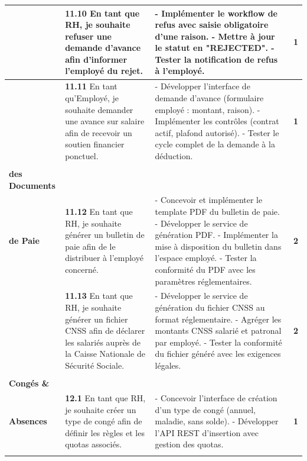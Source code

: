 \begin{small}
\begin{longtable}{|>{\raggedright\arraybackslash}p{2.8cm}|>{\raggedright\arraybackslash}p{6.2cm}|>{\raggedright\arraybackslash}p{6.2cm}|c|}
& \textbf{11.10} En tant que RH, je souhaite refuser une demande d'avance afin d'informer l'employé du rejet.
& - Implémenter le workflow de refus avec saisie obligatoire d'une raison.\newline
- Mettre à jour le statut en "REJECTED".\newline
- Tester la notification de refus à l'employé.
& \textbf{1} \\ \cline{2-4}

& \textbf{11.11} En tant qu'Employé, je souhaite demander une avance sur salaire afin de recevoir un soutien financier ponctuel.
& - Développer l'interface de demande d'avance (formulaire employé : montant, raison).\newline
- Implémenter les contrôles (contrat actif, plafond autorisé).\newline
- Tester le cycle complet de la demande à la déduction.
& \textbf{1} \\ \hline

\multirow{2}{*}{\makecell[c]{\textbf{Génération}\\ \textbf{des Documents}\\ \textbf{de Paie}}}
& \textbf{11.12} En tant que RH, je souhaite générer un bulletin de paie afin de le distribuer à l'employé concerné.
& - Concevoir et implémenter le template PDF du bulletin de paie.\newline
- Développer le service de génération PDF.\newline
- Implémenter la mise à disposition du bulletin dans l'espace employé.\newline
- Tester la conformité du PDF avec les paramètres réglementaires.
& \textbf{2} \\ \cline{2-4}

& \textbf{11.13} En tant que RH, je souhaite générer un fichier CNSS afin de déclarer les salariés auprès de la Caisse Nationale de Sécurité Sociale.
& - Développer le service de génération du fichier CNSS au format réglementaire.\newline
- Agréger les montants CNSS salarié et patronal par employé.\newline
- Tester la conformité du fichier généré avec les exigences légales.
& \textbf{2} \\ \hline

\multirow{5}{*}{\makecell[c]{\textbf{Gestion des}\\ \textbf{Congés \&}\\ \textbf{Absences}}}
& \textbf{12.1} En tant que RH, je souhaite créer un type de congé afin de définir les règles et les quotas associés.
& - Concevoir l'interface de création d'un type de congé (annuel, maladie, sans solde).\newline
- Développer l'API REST d'insertion avec gestion des quotas.
& \textbf{1} \\ \cline{2-4}


\end{longtable}
\end{small}
